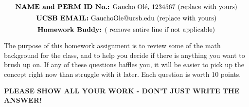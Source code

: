 \documentclass[11pt]{article}
\begin{document}
\noindent{}
$$\mbox{\textbf {NAME and PERM ID No.:} Gaucho Ol\'e, 1234567 (replace with yours)}$$
$$\mbox{\textbf {UCSB EMAIL:} GauchoOle@ucsb.edu (replace with yours)}$$
$$\mbox{\textbf {Homework Buddy:} ( remove entire line if not applicable)}$$

\medskip

The purpose of this homework assignment is to review some of the math background
for the class, and to help you decide if there is anything you want to 
brush up on. If any of these questions baffles you,
it will be easier to pick up the concept right now than struggle with it
later. Each question is worth 10 points. 

\textbf{PLEASE SHOW ALL YOUR WORK - DON'T JUST WRITE THE ANSWER!}
\end{document}
